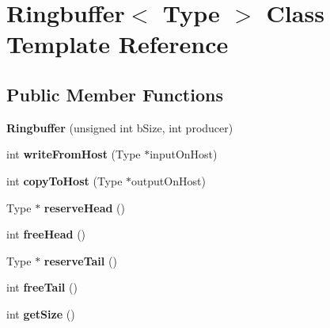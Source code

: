 \hypertarget{classRingbuffer}{\section{Ringbuffer$<$ Type $>$ Class Template Reference}
\label{classRingbuffer}
}
\subsection*{Public Member Functions}
\begin{DoxyCompactItemize}
\item 
\hypertarget{classRingbuffer_ae2ff732b1a9a88f95d57ce27330c00ad}{{\bfseries Ringbuffer} (unsigned int b\-Size, int producer)}\label{classRingbuffer_ae2ff732b1a9a88f95d57ce27330c00ad}

\item 
\hypertarget{classRingbuffer_ac8b2973f3ab190cf778535c394ba980d}{int {\bfseries write\-From\-Host} (Type $\ast$input\-On\-Host)}\label{classRingbuffer_ac8b2973f3ab190cf778535c394ba980d}

\item 
\hypertarget{classRingbuffer_a97f008c10065843bbab49579c8ce3ce4}{int {\bfseries copy\-To\-Host} (Type $\ast$output\-On\-Host)}\label{classRingbuffer_a97f008c10065843bbab49579c8ce3ce4}

\item 
\hypertarget{classRingbuffer_acf64a0c3c16f208dd1191130b0d18b33}{Type $\ast$ {\bfseries reserve\-Head} ()}\label{classRingbuffer_acf64a0c3c16f208dd1191130b0d18b33}

\item 
\hypertarget{classRingbuffer_a1d8b62be3d51a00930e7b06d1ad2df53}{int {\bfseries free\-Head} ()}\label{classRingbuffer_a1d8b62be3d51a00930e7b06d1ad2df53}

\item 
\hypertarget{classRingbuffer_a3aadf9953f637b327125d96fa6d2c65c}{Type $\ast$ {\bfseries reserve\-Tail} ()}\label{classRingbuffer_a3aadf9953f637b327125d96fa6d2c65c}

\item 
\hypertarget{classRingbuffer_a66193754bca336ed8b8f2d5a9a89995c}{int {\bfseries free\-Tail} ()}\label{classRingbuffer_a66193754bca336ed8b8f2d5a9a89995c}

\item 
\hypertarget{classRingbuffer_aefca234ed766de811794f6ab91e86d17}{int {\bfseries get\-Size} ()}\label{classRingbuffer_aefca234ed766de811794f6ab91e86d17}


\end{DoxyCompactItemize}
